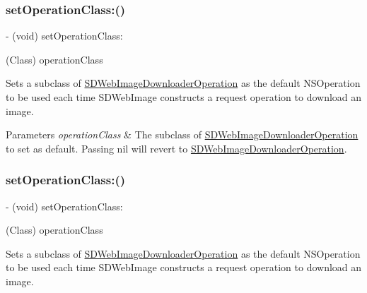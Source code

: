 \subsubsection{\texorpdfstring{set\+Operation\+Class\+:()}{setOperationClass:()}\hspace{0.1cm}{\footnotesize\ttfamily [1/3]}}
{\footnotesize\ttfamily -\/ (void) set\+Operation\+Class\+: \begin{DoxyParamCaption}\item[{(Class)}]{operation\+Class }\end{DoxyParamCaption}}

Sets a subclass of {\ttfamily \mbox{\hyperlink{interface_s_d_web_image_downloader_operation}{S\+D\+Web\+Image\+Downloader\+Operation}}} as the default {\ttfamily N\+S\+Operation} to be used each time S\+D\+Web\+Image constructs a request operation to download an image.


\begin{DoxyParams}{Parameters}
{\em operation\+Class} & The subclass of {\ttfamily \mbox{\hyperlink{interface_s_d_web_image_downloader_operation}{S\+D\+Web\+Image\+Downloader\+Operation}}} to set as default. Passing {\ttfamily nil} will revert to {\ttfamily \mbox{\hyperlink{interface_s_d_web_image_downloader_operation}{S\+D\+Web\+Image\+Downloader\+Operation}}}. \\
\hline
\end{DoxyParams}
\mbox{\label{interface_s_d_web_image_downloader_a27a55eb9ae3c7b1c9f3a2617420390e9}} 
\subsubsection{\texorpdfstring{set\+Operation\+Class\+:()}{setOperationClass:()}\hspace{0.1cm}{\footnotesize\ttfamily [2/3]}}
{\footnotesize\ttfamily -\/ (void) set\+Operation\+Class\+: \begin{DoxyParamCaption}\item[{(Class)}]{operation\+Class }\end{DoxyParamCaption}}

Sets a subclass of {\ttfamily \mbox{\hyperlink{interface_s_d_web_image_downloader_operation}{S\+D\+Web\+Image\+Downloader\+Operation}}} as the default {\ttfamily N\+S\+Operation} to be used each time S\+D\+Web\+Image constructs a request operation to download an image.


